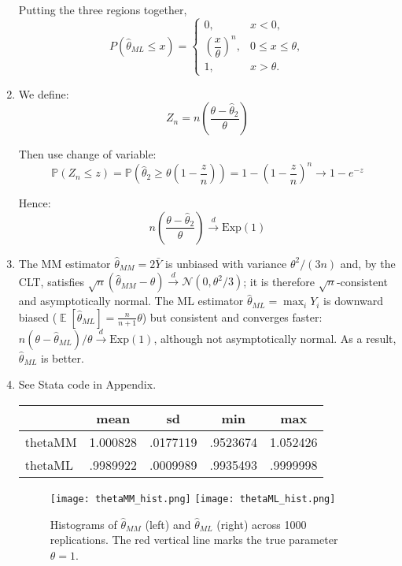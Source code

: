 \documentclass[12pt]{article}
\DeclareMathOperator{\E}{\mathbb{E}}
\begin{document}
\begin{flushleft}
\begin{enumerate}[label=(\alph*)]
Putting the three regions together,
\[
P(\hat\theta_{ML} \le x)
=
\begin{cases}
0, & x<0,\\[6pt]
\left(\dfrac{x}{\theta}\right)^n, & 0\le x \le \theta,\\[10pt]
1, & x>\theta.
\end{cases}
\]
\item

We define:
\[
Z_n = n \left( \frac{\theta - \hat{\theta}_2}{\theta} \right)
\]

Then use change of variable:
\[
\mathbb{P}(Z_n \leq z) = \mathbb{P}\left( \hat{\theta}_2 \geq \theta \left(1 - \frac{z}{n} \right) \right) = 1 - \left(1 - \frac{z}{n} \right)^n \to 1 - e^{-z}
\]

Hence:
\[
n \left( \frac{\theta - \hat{\theta}_2}{\theta} \right) \xrightarrow{d} \text{Exp}(1)
\]

\item 
The MM estimator $\hat\theta_{MM}=2\bar Y$ is unbiased with variance $\theta^2/(3n)$ and, by the CLT, satisfies $\sqrt{n}(\hat\theta_{MM}-\theta)\xrightarrow{d}\mathcal N(0,\theta^2/3)$; it is therefore $\sqrt{n}$-consistent and asymptotically normal. The ML estimator $\hat\theta_{ML}=\max_i Y_i$ is downward biased ($\E[\hat\theta_{ML}]=\tfrac{n}{n+1}\theta$) but consistent and converges faster: $n(\theta-\hat\theta_{ML})/\theta \xrightarrow{d}\mathrm{Exp}(1)$, although not asymptotically normal. As a result, $\hat{\theta}_{ML}$ is better.
\item See Stata code in Appendix.

{
\def\sym#1{\ifmmode^{#1}\else\(^{#1}\)\fi}
\begin{tabular}{l*{1}{cccc}}
\toprule
                    &        mean&          sd&         min&         max\\
\midrule
thetaMM             &    1.000828&    .0177119&    .9523674&    1.052426\\
thetaML             &    .9989922&    .0009989&    .9935493&    .9999998\\
\bottomrule
\end{tabular}
}
\begin{figure}[h!]
    \centering
    \texttt{[image: thetaMM\_hist.png]}
    \texttt{[image: thetaML\_hist.png]}
    \caption{Histograms of $\hat\theta_{MM}$ (left) and $\hat\theta_{ML}$ (right) across 1000 replications. 
    The red vertical line marks the true parameter $\theta=1$.}
    \label{fig:mmml}
\end{figure}


\end{enumerate}
\end{flushleft}
\end{document}
